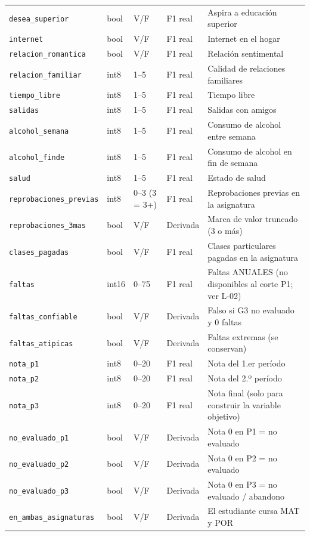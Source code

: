 \begin{tabular}{p{3.9cm}p{1.2cm}p{2.2cm}p{1.9cm}p{5.6cm}}
\texttt{desea\_superior} & bool & V/F & F1 real & Aspira a educación superior \\
\texttt{internet} & bool & V/F & F1 real & Internet en el hogar \\
\texttt{relacion\_romantica} & bool & V/F & F1 real & Relación sentimental \\
\texttt{relacion\_familiar} & int8 & 1–5 & F1 real & Calidad de relaciones familiares \\
\texttt{tiempo\_libre} & int8 & 1–5 & F1 real & Tiempo libre \\
\texttt{salidas} & int8 & 1–5 & F1 real & Salidas con amigos \\
\texttt{alcohol\_semana} & int8 & 1–5 & F1 real & Consumo de alcohol entre semana \\
\texttt{alcohol\_finde} & int8 & 1–5 & F1 real & Consumo de alcohol en fin de semana \\
\texttt{salud} & int8 & 1–5 & F1 real & Estado de salud \\
\texttt{reprobaciones\_previas} & int8 & 0–3 (3 = 3+) & F1 real & Reprobaciones previas en la asignatura \\
\texttt{reprobaciones\_3mas} & bool & V/F & Derivada & Marca de valor truncado (3 o más) \\
\texttt{clases\_pagadas} & bool & V/F & F1 real & Clases particulares pagadas en la asignatura \\
\texttt{faltas} & int16 & 0–75 & F1 real & Faltas ANUALES (no disponibles al corte P1; ver L-02) \\
\texttt{faltas\_confiable} & bool & V/F & Derivada & Falso si G3 no evaluado y 0 faltas \\
\texttt{faltas\_atipicas} & bool & V/F & Derivada & Faltas extremas (se conservan) \\
\texttt{nota\_p1} & int8 & 0–20 & F1 real & Nota del 1.er período \\
\texttt{nota\_p2} & int8 & 0–20 & F1 real & Nota del 2.º período \\
\texttt{nota\_p3} & int8 & 0–20 & F1 real & Nota final (solo para construir la variable objetivo) \\
\texttt{no\_evaluado\_p1} & bool & V/F & Derivada & Nota 0 en P1 = no evaluado \\
\texttt{no\_evaluado\_p2} & bool & V/F & Derivada & Nota 0 en P2 = no evaluado \\
\texttt{no\_evaluado\_p3} & bool & V/F & Derivada & Nota 0 en P3 = no evaluado / abandono \\
\texttt{en\_ambas\_asignaturas} & bool & V/F & Derivada & El estudiante cursa MAT y POR \\

\end{tabular}
